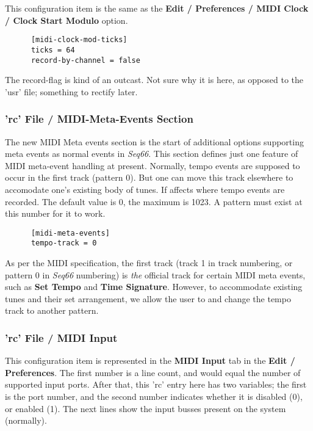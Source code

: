   This configuration item is the same as the
   \textbf{Edit / Preferences / MIDI Clock / Clock Start Modulo} option.

   \begin{verbatim}
      [midi-clock-mod-ticks]
      ticks = 64
      record-by-channel = false
   \end{verbatim}

   The record-flag is kind of an outcast.  Not sure why it is here, as
   opposed to the 'usr' file;
   something to rectify later.

\subsubsection{'rc' File / MIDI-Meta-Events Section}
\label{subsubsec:configuration_rc_midi_meta_events}

   The new MIDI Meta events section is the start of additional options
   supporting meta events as normal events in \textsl{Seq66}.
   This section defines just one feature of MIDI meta-event handling at present.
   Normally, tempo events are supposed to occur in the first track (pattern 0).
   But one can move this track elsewhere to accomodate one's existing body of
   tunes.  If affects where tempo events are recorded.  The default value is 0,
   the maximum is 1023.  A pattern must exist at this number for it to work.

   \begin{verbatim}
      [midi-meta-events]
      tempo-track = 0
   \end{verbatim}

   As per the MIDI specification, the first track (track 1 in track
   numbering, or pattern 0 in \textsl{Seq66} numbering) is \textsl{the}
   official track for certain MIDI meta events, such as
   \textbf{Set Tempo} and
   \textbf{Time Signature}.
   However, to accommodate existing tunes and their set
   arrangement, we allow the user to
   and change the tempo track to another pattern.

\subsubsection{'rc' File / MIDI Input}
\label{subsubsec:configuration_rc_midi_input}

   This configuration item is represented in the
   \textbf{MIDI Input} tab in the \textbf{Edit / Preferences}.
   The first number is a line count, and would equal the number of
   supported input ports.
   After that, this 'rc' entry here has two variables;
   the first is the port number,
   and the second number indicates whether it is disabled (0), or enabled (1).
   The next lines show the input busses present on the system (normally).

